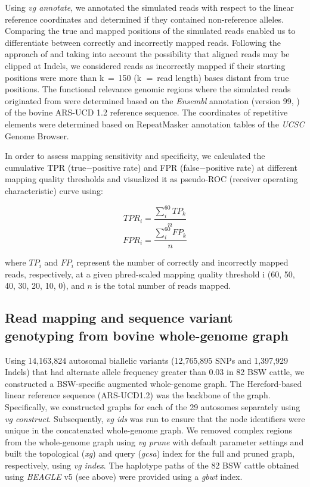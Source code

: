 \documentclass[../main.tex]{subfiles}
\begin{document}
Using \emph{vg annotate}, we annotated the simulated reads with respect to the linear reference coordinates and determined if they contained non-reference alleles. Comparing the true and mapped positions of the simulated reads enabled us to differentiate between correctly and incorrectly mapped reads. Following the approach of \citet{garrison2018variation} and taking into account the possibility that aligned reads may be clipped at Indels, we considered reads as incorrectly mapped if their starting positions were more than k $=$ 150 (k $=$ read length) bases distant from true positions. The functional relevance genomic regions where the simulated reads originated from were determined based on the \emph{Ensembl} annotation (version 99, \citep{yates2020ensembl}) of the bovine ARS-UCD 1.2 reference sequence. The coordinates of repetitive elements were determined based on RepeatMasker \citep{smith2013repeatmasker} annotation tables of the \emph{UCSC} Genome Browser.

In order to assess mapping sensitivity and specificity, we calculated the cumulative TPR (true$-$positive rate) and FPR (false$-$positive rate) at different mapping quality thresholds and visualized it as pseudo-ROC (receiver operating characteristic) curve \citep{garrison2018variation} using:

\[TPR_i=\frac{\sum_{i}^{60}TP_k}{n}\]
\[FPR_i=\frac{\sum_{i}^{60}FP_k}{n}\]

where $TP_i$ and $FP_i$ represent the number of correctly and incorrectly mapped reads, respectively, at a given phred-scaled mapping quality threshold i (60, 50, 40, 30, 20, 10, 0), and $n$ is the total number of reads mapped.

\subsection*{Read mapping and sequence variant genotyping from bovine whole-genome graph}

Using 14,163,824 autosomal biallelic variants (12,765,895 SNPs and 1,397,929 Indels) that had alternate allele frequency greater than 0.03 in 82 BSW cattle, we constructed a BSW-specific augmented whole-genome graph. The Hereford-based linear reference sequence (ARS-UCD1.2) was the backbone of the graph. Specifically, we constructed graphs for each of the 29 autosomes separately using \emph{vg construct}. Subsequently, \emph{vg ids} was run to ensure that the node identifiers were unique in the concatenated whole-genome graph. We removed complex regions from the whole-genome graph using \emph{vg prune} with default parameter settings and built the topological (\emph{xg}) and query (\emph{gcsa}) index for the full and pruned graph, respectively, using \emph{vg index}. The haplotype paths of the 82 BSW cattle obtained using \emph{BEAGLE} v5 (see above) were provided using a \emph{gbwt} index.
\end{document}
